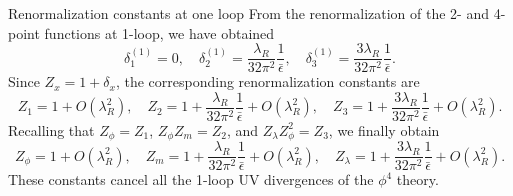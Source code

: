 \documentclass[aspectratio=169,10pt]{beamer}
\begin{document}
\begin{frame}{Renormalization constants at one loop}
    From the renormalization of the 2- and 4-point functions at 1-loop, we have obtained
    \begin{equation}
    \label{eq: counter-terms at 1-loop}
        \delta_1^{(1)}=0,\quad \delta_2^{(1)}=\frac{\lambda_R}{32\pi^2}\frac{1}{\bar{\epsilon}},\quad \delta_3^{(1)}=\frac{3\lambda_R}{32\pi^2}\frac{1}{\bar{\epsilon}}.
    \end{equation}
    Since $Z_x = 1 + \delta_x$, the corresponding renormalization constants are
    \begin{equation}
        Z_1 = 1 + O(\lambda_R^2),\quad Z_2 = 1 + \frac{\lambda_R}{32\pi^2}\frac{1}{\bar{\epsilon}} + O(\lambda_R^2),\quad Z_3 = 1 + \frac{3\lambda_R}{32\pi^2}\frac{1}{\bar{\epsilon}}+O(\lambda_R^2).
    \end{equation}
    Recalling that $Z_\phi = Z_1$, $Z_\phi Z_m = Z_2$, and $Z_\lambda Z_\phi^2 = Z_3$, we finally obtain
    \begin{equation}
    \label{eq: renormalization constants Zphi, Zm, and Zlambda}
        Z_\phi = 1 + O(\lambda_R^2),\quad Z_m = 1 + \frac{\lambda_R}{32\pi^2}\frac{1}{\bar{\epsilon}}+ O(\lambda_R^2),\quad Z_\lambda = 1 + \frac{3\lambda_R}{32\pi^2}\frac{1}{\bar{\epsilon}} + O(\lambda_R^2).
    \end{equation}
    These constants cancel all the 1-loop UV divergences of the $\phi^4$ theory.
\end{frame}
\end{document}
